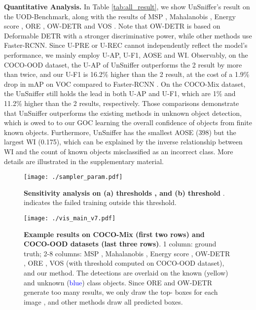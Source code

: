 \documentclass[10pt,twocolumn,letterpaper]{article}
\newcommand{\xf}[1]{{\color{black} #1}}
\newcommand{\net}{UnSniffer\xspace}
\begin{document}
\noindent\textbf{Quantitative Analysis.}
In Table \ref{tab:all_result},
we show \net's result on the UOD-Benchmark,
along with the results of MSP \cite{hendrycks2016baseline}, Mahalanobis \cite{denouden2018improving}, Energy score \cite{liu2020energy}, ORE \cite{owod}, OW-DETR \cite{OWDETR} and VOS \cite{vos}.
Note that OW-DETR is based on Deformable DETR \cite{zhu2020deformable} with a stronger discriminative power,
while other methods use Faster-RCNN.
Since U-PRE or U-REC cannot independently reflect the model's performance,
we mainly employ U-AP, U-F1, AOSE and WI.
Observably,
on the COCO-OOD dataset, the U-AP of UnSniffer outperforms the 2 result by more than twice, and our U-F1 is 16.2\% higher than the 2 result,
at the cost of a 1.9\% drop in mAP on VOC compared to Faster-RCNN \cite{ren2015faster}.
On the COCO-Mix dataset,
the UnSniffer still holds the lead in both U-AP and U-F1,
which are 1\% and 11.2\% higher than the 2 results, respectively.
Those comparisons demonstrate that UnSniffer outperforms the existing methods in unknown object detection,
which \xf{is owed to} to our GOC learning the overall confidence of objects from finite known objects.
Furthermore, UnSniffer has the smallest AOSE (398) but the largest WI (0.175),
which can be explained by the inverse relationship between WI and the count of known objects misclassified as an incorrect class.
More details are illustrated in the supplementary material.



\begin{figure}
\centering
\texttt{[image: ./sampler\_param.pdf]}
\vspace{-2em}
\caption{
\textbf{Sensitivity analysis on (a) thresholds , and (b) threshold }.
 indicates the failed training outside this threshold.
}
\vspace{-0.6em}
\label{fig:samplingandstrategies}
\end{figure}

\begin{figure*}[t!]
\centering
\texttt{[image: ./vis\_main\_v7.pdf]}
\vspace{-1.5em}
\caption{\textbf{Example results on COCO-Mix (first two rows) and COCO-OOD datasets (last three rows)}.
1 column: ground truth;
2-8 columns:
MSP \cite{hendrycks2016baseline}, Mahalanobis \cite{denouden2018improving}, Energy score \cite{liu2020energy}, OW-DETR \cite{OWDETR}, ORE \cite{owod}, VOS \cite{vos} (with threshold computed on COCO-OOD dataset), and our method.
The detections are overlaid on the known (\textcolor{yellow2}{yellow}) and unknown (\textcolor{blue}{blue}) class objects.
Since ORE and OW-DETR generate too many results,
we only draw the top- boxes for each image \xf{, and} other methods draw all predicted boxes.}
\label{fig:Qualitative}
\vspace{-1.1em}
\end{figure*}
\end{document}
